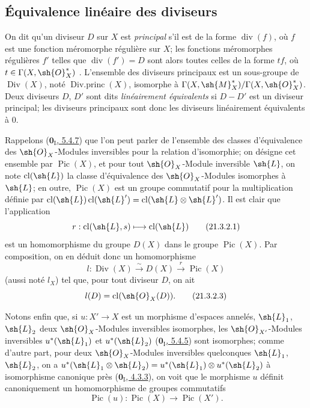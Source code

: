 
\subsection{Équivalence linéaire des diviseurs}
\label{subsection:IV.21.3}

\begin{env}[21.3.1]
\label{IV.21.3.1}
On dit qu'un diviseur $D$ sur $X$ est \emph{principal} s'il est de la forme $\operatorname{div}(f)$, où $f$ est une fonction méromorphe régulière sur $X$;
les fonctions méromorphes régulières $f'$ telles que $\operatorname{div}(f')=D$ sont alors toutes celles de la forme $tf$, où $t\in\Gamma(X,\sh{O}_X^*)$ .
L'ensemble des diviseurs principaux est un sous-groupe de $\operatorname{Div}(X)$, noté $\operatorname{Div.princ}(X)$, isomorphe à $\Gamma(X,\sh{M}_X^*)/\Gamma(X,\sh{O}_X^*)$.
Deux diviseurs $D$, $D'$ sont dits \emph{linéairement équivalents} si $D-D'$ est un diviseur principal;
les diviseurs principaux sont donc les diviseurs linéairement équivalents à $0$.
\end{env}

\begin{env}[21.3.2]
\label{IV.21.3.2}
Rappelons (\hyperref[0.5.4.7]{$\mathbf{0}_{\mathrm I}$, 5.4.7}) que l'on peut parler de l'ensemble des classes d'équivalence des $\sh{O}_X$-Modules inversibles pour la relation d'isomorphie;
on désigne cet ensemble par $\operatorname{Pic}(X)$, et pour tout $\sh{O}_X$-Module inversible $\sh{L}$, on note $\operatorname{cl}(\sh{L})$ la classe d'équivalence des $\sh{O}_X$-Modules isomorphes à $\sh{L}$;
en outre, $\operatorname{Pic}(X)$ est un groupe commutatif pour la multiplication définie par $\operatorname{cl}(\sh{L})\operatorname{cl}(\sh{L}')=\operatorname{cl}(\sh{L}\otimes\sh{L}')$.
Il est clair que l'application
\[
\label{IV.21.3.2.1}
  r:\operatorname{cl}(\sh{L},s)\mapsto\operatorname{cl}(\sh{L})
  \tag{21.3.2.1}
\]
est un homomorphisme du groupe $D(X)$  dans le groupe $\operatorname{Pic}(X)$.
Par composition, on en déduit donc un homomorphisme
\[
\label{IV.21.3.2.2}
  l:\operatorname{Div}(X)\xrightarrow{\sim}D(X)\xrightarrow{r}\operatorname{Pic}(X)
  \tag{21.3.2.2}
\]
(aussi noté $l_X$) tel que, pour tout diviseur $D$, on ait
\[
\label{IV.21.3.2.3}
  l(D)=\operatorname{cl}(\sh{O}_X(D)).
  \tag{21.3.2.3}
\]

Notons enfin que, si $u:X'\to X$ est un morphisme d'espaces annelés, $\sh{L}_1$, $\sh{L}_2$ deux $\sh{O}_X$-Modules inversibles isomorphes, les $\sh{O}_{X'}$-Modules inversibles $u^*(\sh{L}_1)$ et $u^*(\sh{L}_2)$ (\hyperref[0.5.4.5]{$\mathbf{0}_{\mathrm I}$, 5.4.5}) sont isomorphes;
comme d'autre part, pour deux $\sh{O}_X$-Modules inversibles quelconques $\sh{L}_1$, $\sh{L}_2$, on a $u^*(\sh{L}_1\otimes\sh{L}_2)=u^*(\sh{L}_1)\otimes u^*(\sh{L}_2)$ à isomorphisme canonique près (\hyperref[0.4.3.3]{$\mathbf{0}_{\mathrm I}$, 4.3.3}), on voit que le morphisme $u$ définit canoniquement un homomorphisme de groupes commutatifs
\[
\label{IV.21.3.2.4}
  \operatorname{Pic}(u):\operatorname{Pic}(X)\to\operatorname{Pic}(X').
  \tag{21.3.2.4}
\]
\end{env}

